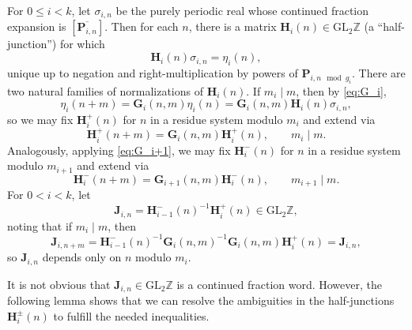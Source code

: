 \documentclass{article}
\numberwithin{equation}{section}
\theoremstyle{definition}
\theoremstyle{remark}
\newcommand{\GL}{\mathrm{GL}}
\newcommand{\ZZ}{\mathbb{Z}}
\newcommand{\<}{\left\langle}
\renewcommand{\>}{\right\rangle}
\begin{document}
For $0 \leq i < k$, let $\sigma_{i,n}$ be the purely periodic real whose continued fraction expansion is $[\overline{\mathbf{P}_{i,n}}]$. Then for each $n$, there is a matrix $\mathbf{H}_i(n) \in \GL_2\ZZ$ (a ``half-junction'') for which
\begin{equation} \label{eq:H_property}
  \mathbf{H}_i(n) \sigma_{i,n} = \eta_i(n),
\end{equation}
unique up to negation and right-multiplication by powers of $\mathbf{P}_{i,n \mod g_i}$. There are two natural families of normalizations of $\mathbf{H}_i(n)$. If $m_i \mid m$, then by \eqref{eq:G_i},
\begin{equation*}
  \eta_{i}(n + m) = \mathbf{G}_i(n, m) \eta_i(n) = \mathbf{G}_i(n, m) \mathbf{H}_i(n) \sigma_{i,n},
\end{equation*}
so we may fix $\mathbf{H}_i^+(n)$ for $n$ in a residue system modulo $m_i$ and extend via
\begin{equation} \label{eq:H-}
  \mathbf{H}_i^+(n + m) = \mathbf{G}_i(n, m) \mathbf{H}_i^+(n), \qquad m_i \mid m.
\end{equation}
Analogously, applying \eqref{eq:G_i+1}, we may fix $\mathbf{H}_i^-(n)$ for $n$ in a residue system modulo $m_{i+1}$ and extend via
\begin{equation*}
  \mathbf{H}_i^-(n + m) = \mathbf{G}_{i+1}(n, m) \mathbf{H}_i^-(n), \qquad m_{i+1} \mid m.
\end{equation*}
For $0 < i < k$, let
\begin{equation*}
  \mathbf{J}_{i, n} = \mathbf{H}_{i-1}^-(n)^{-1} \mathbf{H}_{i}^+(n) \in \GL_2\ZZ,
\end{equation*}
noting that if $m_i \mid m$, then
\begin{equation} \label{eq:junctions_periodic}
  \mathbf{J}_{i, n+m} = \mathbf{H}_{i-1}^-(n)^{-1} \mathbf{G}_i(n, m)^{-1} \mathbf{G}_i(n, m) \mathbf{H}_{i}^+(n) = \mathbf{J}_{i, n},
\end{equation}
so $\mathbf{J}_{i, n}$ depends only on $n$ modulo $m_i$.

It is not obvious that $\mathbf{J}_{i,n} \in \GL_2\ZZ$ is a continued fraction word. However, the following lemma shows that we can resolve the ambiguities in the half-junctions $\mathbf{H}_i^\pm(n)$ to fulfill the needed inequalities.
\end{document}
